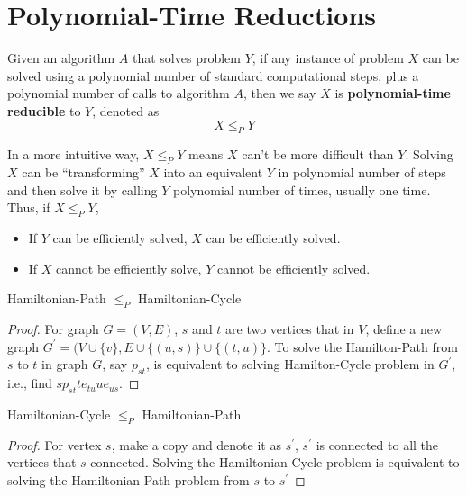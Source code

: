 			\section{Polynomial-Time Reductions}
				\begin{definition}
					Given an algorithm $A$ that solves problem $Y$, if any instance of problem $X$ can be solved using a polynomial number of standard computational steps, plus a polynomial number of calls to algorithm $A$, then we say $X$ is \textbf{polynomial-time reducible} to $Y$, denoted as 
					\begin{equation}
						X \le_P Y
					\end{equation}
				\end{definition}

				In a more intuitive way, $X \le_P Y$ means $X$ can't be more difficult than $Y$. Solving $X$ can be ``transforming'' $X$ into an equivalent $Y$ in polynomial number of steps and then solve it by calling $Y$ polynomial number of times, usually one time. Thus, if $X \le_P Y$,
				\begin{itemize}
					\item If $Y$ can be efficiently solved, $X$ can be efficiently solved.
					\item If $X$ cannot be efficiently solve, $Y$ cannot be efficiently solved.
				\end{itemize}


				\begin{lemma}
					Hamiltonian-Path $\le_P$ Hamiltonian-Cycle
				\end{lemma}
				\begin{proof}
					For graph $G = (V, E)$, $s$ and $t$ are two vertices that in $V$, define a new graph $G^\prime = (V \cup \{v\}, E \cup \{(u, s)\} \cup \{(t, u)\}$. To solve the Hamilton-Path from $s$ to $t$ in graph $G$, say $p_{st}$, is equivalent to solving Hamilton-Cycle problem in $G^\prime$, i.e., find $sp_{st}te_{tu}ue_{us}$.
				\end{proof}

				\begin{lemma}
					Hamiltonian-Cycle $\le_P$ Hamiltonian-Path
				\end{lemma}

				\begin{proof}
					For vertex $s$, make a copy and denote it as $s^\prime$, $s^\prime$ is connected to all the vertices that $s$ connected. Solving the Hamiltonian-Cycle problem is equivalent to solving the Hamiltonian-Path problem from $s$ to $s^\prime$
				\end{proof}

